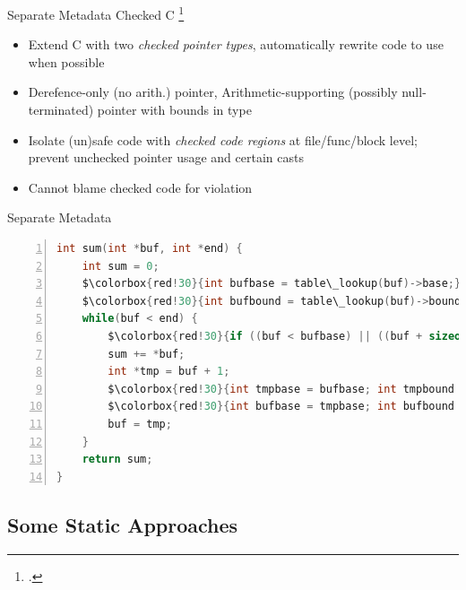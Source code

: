 \documentclass[aspectratio=169]{beamer}
\begin{document}
\begin{frame}{Separate Metadata}
Checked C \footcite{ruef_checked_2017}
    \begin{itemize}
        \item Extend C with two \emph{checked pointer types}, automatically rewrite code to use when possible
        \item Derefence-only (no arith.) pointer, Arithmetic-supporting (possibly null-terminated) pointer with bounds in type
        \item Isolate (un)safe code with \emph{checked code regions} at file/func/block level; prevent unchecked pointer usage and certain casts
        \item Cannot blame checked code for violation
    \end{itemize}
\end{frame}


\begin{frame}[fragile]{Separate Metadata}
  \footnotesize
  \begin{lstlisting}[language=C,numbers=left,mathescape,basicstyle={\footnotesize\ttfamily}]
int sum(int *buf, int *end) {
    int sum = 0;
    $\colorbox{red!30}{int bufbase = table\_lookup(buf)->base;}$
    $\colorbox{red!30}{int bufbound = table\_lookup(buf)->bound;}$
    while(buf < end) {
        $\colorbox{red!30}{if ((buf < bufbase) || ((buf + sizeof(buf)) > bufbound)) abort;}$
        sum += *buf;
        int *tmp = buf + 1;
        $\colorbox{red!30}{int tmpbase = bufbase; int tmpbound = bufbound;}$ // inherit base and bound of original ptr
        $\colorbox{red!30}{int bufbase = tmpbase; int bufbound = tmpbound;}$ // would be optimized out
        buf = tmp;
    }
    return sum;
}
  \end{lstlisting}
\end{frame}

\subsection{Some Static Approaches}
\end{document}
